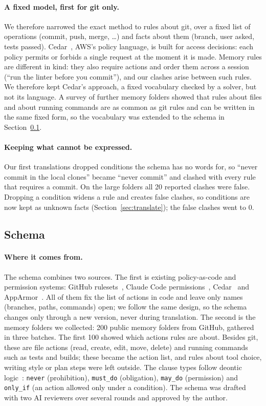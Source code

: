 \documentclass[11pt]{article}
\begin{document}
\paragraph{A fixed model, first for git only.} We therefore narrowed the exact method to rules
about git, over a fixed list of operations (commit, push, merge, \ldots) and facts about them
(branch, user asked, tests passed). Cedar~\cite{cedar}, AWS's policy language, is built for
access decisions: each policy permits or forbids a single request at the moment it is made. Memory
rules are different in kind: they also require actions and order them across a session (``run the
linter before you commit''), and our clashes arise between such rules. We therefore kept Cedar's
approach, a fixed vocabulary checked by a solver, but not its language. A survey of further memory folders showed that rules about files
and about running commands are as common as git rules and can be written in the same fixed form,
so the vocabulary was extended to the schema in Section~\ref{sec:schema}.

\paragraph{Keeping what cannot be expressed.} Our first translations dropped conditions the
schema has no words for, so ``never commit in the local clones'' became ``never commit'' and
clashed with every rule that requires a commit. On the large folders all 20 reported clashes were
false. Dropping a condition widens a rule and creates false clashes, so conditions are now kept as
unknown facts (Section~\ref{sec:translate}); the false clashes went to 0.

\subsection{Schema}\label{sec:schema}

\paragraph{Where it comes from.} The schema combines two sources. The first is existing
policy-as-code and permission systems: GitHub rulesets~\cite{gh-rulesets}, Claude Code
permissions~\cite{cc-permissions}, Cedar~\cite{cedar} and AppArmor~\cite{apparmor}. All of them fix
the list of actions in code and leave only names (branches, paths, commands) open; we follow the
same design, so the schema changes only through a new version, never during translation. The
second is the memory folders we collected: 200 public memory folders from GitHub, gathered in
three batches. The first 100 showed which actions rules are about. Besides git, these are file
actions (read, create, edit, move, delete) and running commands such as tests and builds; these
became the action list, and rules about tool choice, writing style or plan steps were left outside.
The clause types follow deontic logic~\cite{vonwright}: \texttt{never} (prohibition),
\texttt{must\_do} (obligation), \texttt{may\_do} (permission) and \texttt{only\_if} (an action
allowed only under a condition). The schema was drafted with two AI reviewers over several rounds
and approved by the author.
\end{document}
